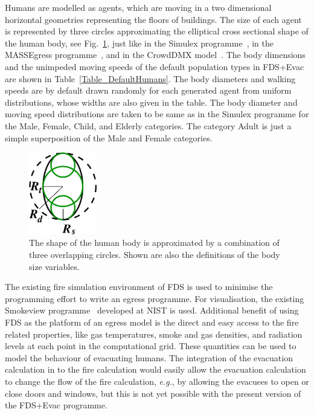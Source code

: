 \documentclass[12pt,a4paper,final,twoside]{stylevk}
\begin{document}
Humans are modelled as agents, which are moving in a two dimensional
horizontal geometries representing the floors of buildings.  The size
of each agent is represented by three circles approximating the
elliptical cross sectional shape of the human body, see
Fig.~\ref{Fig_HumanBody}, just like in the Simulex
programme~\cite{Simulex96, Thompson95a, Thompson95b, Thompson03}, in
the MASSEgress programme~\cite{Pan06}, and in the CrowdDMX
model~\cite{Langston06, Langston09}.  The body dimensions and the
unimpeded moving speeds of the default population types in FDS+Evac
are shown in Table~\ref{Table_DefaultHumans}.  The body diameters and
walking speeds are by default drawn randomly for each generated agent
from uniform distributions, whose widths are also given in the table.
The body diameter and moving speed distributions are taken to be same
as in the Simulex programme for the Male, Female, Child, and Elderly
categories.  The category Adult is just a simple superposition of the
Male and Female categories.

%
\begin{figure}[tb]
  \centerline{\includegraphics[clip=true, width=30mm]{FIGURES/body_shape}} 
  \caption{The shape of the human body is approximated by a
    combination of three overlapping circles.  Shown are also the
    definitions of the body size variables.}\label{Fig_HumanBody}
\end{figure}
%

The existing fire simulation environment of FDS is used to minimise
the programming effort to write an egress programme.  For
visualisation, the existing Smokeview programme~\cite{SV_UserGuide}
developed at NIST is used.  Additional benefit of using FDS as the
platform of an egress model is the direct and easy access to the fire
related properties, like gas temperatures, smoke and gas densities,
and radiation levels at each point in the computational grid.  These
quantities can be used to model the behaviour of evacuating humans.
The integration of the evacuation calculation in to the fire
calculation would easily allow the evacuation calculation to change
the flow of the fire calculation, \emph{e.g.}, by allowing the
evacuees to open or close doors and windows, but this is not yet
possible with the present version of the FDS+Evac programme.
\end{document}
